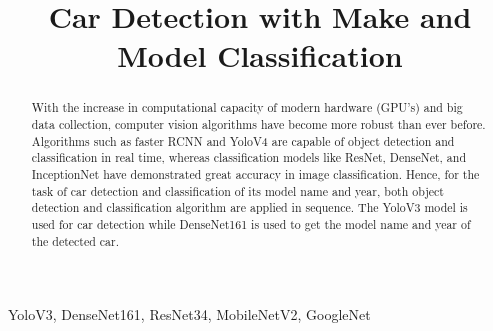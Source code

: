 \documentclass[conference]{IEEEtran}
\begin{document}
\graphicspath{{./projectImages/}}
\title{Car Detection with Make and Model Classification}

\author{
}

\maketitle
\begin{abstract} \label{Abstract}
    With the increase in computational capacity of modern hardware (GPU’s) and big data collection, computer vision algorithms have become more robust than ever before. Algorithms such as faster RCNN and YoloV4 are capable of object detection and classification in real time, whereas classification models like ResNet, DenseNet, and InceptionNet have demonstrated great accuracy in image classification. Hence, for the task of car detection and classification of its model name and year, both object detection and classification algorithm are applied in sequence. The YoloV3 model is used for car detection while DenseNet161 is used to get the model name and year of the detected car. %
\end{abstract}
\begin{IEEEkeywords}
YoloV3, DenseNet161, ResNet34, MobileNetV2, GoogleNet  
\end{IEEEkeywords}
\end{document}
